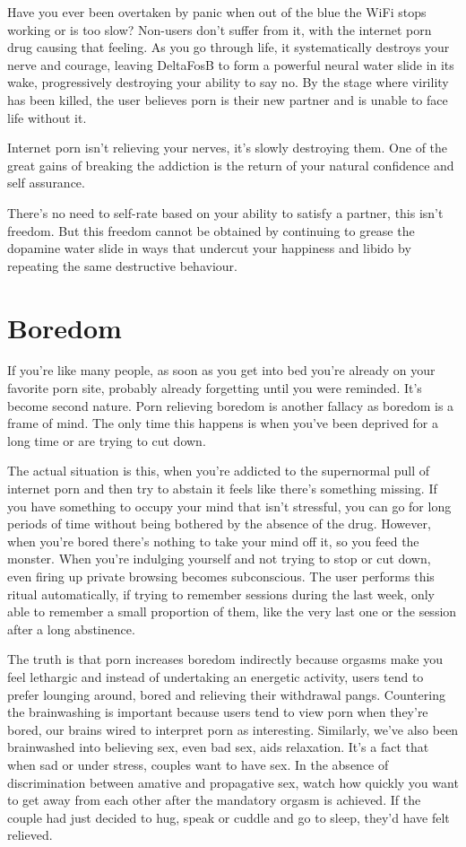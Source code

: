 \documentclass[easypeasy.tex]{subfiles}
\begin{document}
Have you ever been overtaken by panic when out of the blue the WiFi stops working or is too slow? Non-users don't suffer from it, with the internet porn drug causing that feeling. As you go through life, it systematically destroys your nerve and courage, leaving DeltaFosB to form a powerful neural water slide in its wake, progressively destroying your ability to say no. By the stage where virility has been killed, the user believes porn is their new partner and is unable to face life without it.

Internet porn isn't relieving your nerves, it's slowly destroying them. One of the great gains of breaking the addiction is the return of your natural confidence and self assurance.

There's no need to self-rate based on your ability to satisfy a partner, this isn't freedom. But this freedom cannot be obtained by continuing to grease the dopamine water slide in ways that undercut your happiness and libido by repeating the same destructive behaviour.

\section{Boredom}

If you're like many people, as soon as you get into bed you're already on your favorite porn site, probably already forgetting until you were reminded. It's become second nature. Porn relieving boredom is another fallacy as boredom is a frame of mind. The only time this happens is when you've been deprived for a long time or are trying to cut down.

The actual situation is this, when you're addicted to the supernormal pull of internet porn and then try to abstain it feels like there's something missing. If you have something to occupy your mind that isn't stressful, you can go for long periods of time without being bothered by the absence of the drug. However, when you're bored there's nothing to take your mind off it, so you feed the monster. When you're indulging yourself and not trying to stop or cut down, even firing up private browsing becomes subconscious. The user performs this ritual automatically, if trying to remember sessions during the last week, only able to remember a small proportion of them, like the very last one or the session after a long abstinence.

The truth is that porn increases boredom indirectly because orgasms make you feel lethargic and instead of undertaking an energetic activity, users tend to prefer lounging around, bored and relieving their withdrawal pangs. Countering the brainwashing is important because users tend to view porn when they're bored, our brains wired to interpret porn as interesting. Similarly, we've also been brainwashed into believing sex, even bad sex, aids relaxation. It's a fact that when sad or under stress, couples want to have sex. In the absence of discrimination between amative and propagative sex, watch how quickly you want to get away from each other after the mandatory orgasm is achieved. If the couple had just decided to hug, speak or cuddle and go to sleep, they'd have felt relieved.
\end{document}

